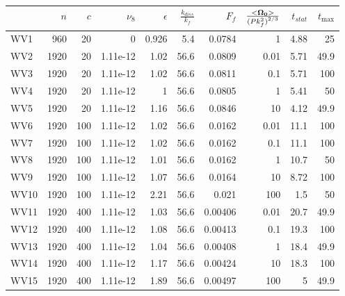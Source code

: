 \documentclass[a4paper]{article}
\begin{document}
\begin{tabular}{lrrrrrrrrr}
\toprule
{} &   $n$ &  $c$ &  $\nu_8$ &  $\epsilon$ &  $\frac{k_{diss}}{k_f}$ &   $F_f$ &  $\frac{<\bf \Omega_0 >}{{(P k_f^2)}^{2/3}}$ &  $t_{stat}$ &  $t_{\max}$ \\
\midrule
WV1  &   960 &   20 &        0 &       0.926 &                     5.4 &  0.0784 &                                            1 &        4.88 &          25 \\
WV2  &  1920 &   20 & 1.11e-12 &        1.02 &                    56.6 &  0.0809 &                                         0.01 &        5.71 &        49.9 \\
WV3  &  1920 &   20 & 1.11e-12 &        1.02 &                    56.6 &  0.0811 &                                          0.1 &        5.71 &         100 \\
WV4  &  1920 &   20 & 1.11e-12 &           1 &                    56.6 &  0.0805 &                                            1 &        5.41 &          50 \\
WV5  &  1920 &   20 & 1.11e-12 &        1.16 &                    56.6 &  0.0846 &                                           10 &        4.12 &        49.9 \\
WV6  &  1920 &  100 & 1.11e-12 &        1.02 &                    56.6 &  0.0162 &                                         0.01 &        11.1 &         100 \\
WV7  &  1920 &  100 & 1.11e-12 &        1.02 &                    56.6 &  0.0162 &                                          0.1 &        11.1 &         100 \\
WV8  &  1920 &  100 & 1.11e-12 &        1.01 &                    56.6 &  0.0162 &                                            1 &        10.7 &          50 \\
WV9  &  1920 &  100 & 1.11e-12 &        1.07 &                    56.6 &  0.0164 &                                           10 &        8.72 &         100 \\
WV10 &  1920 &  100 & 1.11e-12 &        2.21 &                    56.6 &   0.021 &                                          100 &         1.5 &          50 \\
WV11 &  1920 &  400 & 1.11e-12 &        1.03 &                    56.6 & 0.00406 &                                         0.01 &        20.7 &        49.9 \\
WV12 &  1920 &  400 & 1.11e-12 &        1.08 &                    56.6 & 0.00413 &                                          0.1 &        19.3 &         100 \\
WV13 &  1920 &  400 & 1.11e-12 &        1.04 &                    56.6 & 0.00408 &                                            1 &        18.4 &        49.9 \\
WV14 &  1920 &  400 & 1.11e-12 &        1.17 &                    56.6 & 0.00424 &                                           10 &        18.3 &         100 \\
WV15 &  1920 &  400 & 1.11e-12 &        1.89 &                    56.6 & 0.00497 &                                          100 &           5 &        49.9 \\
\bottomrule
\end{tabular}
\end{document}

